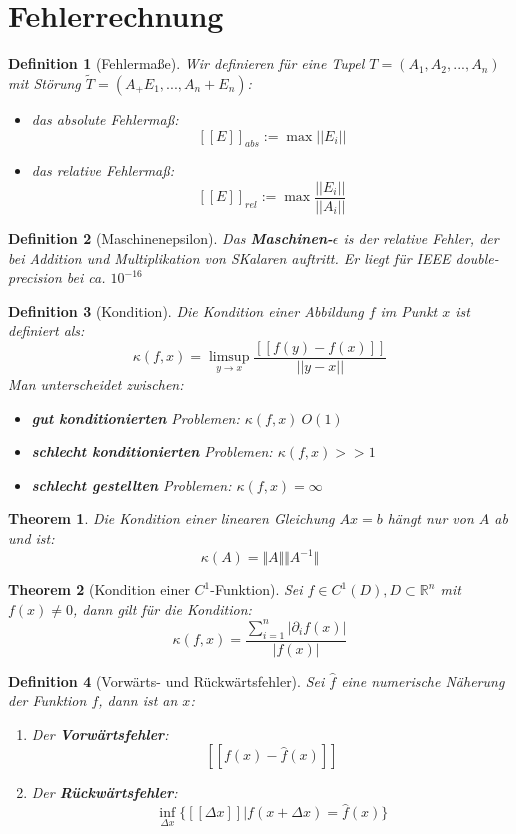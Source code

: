 \documentclass[10pt,a4paper]{article}
\newtheorem{theorem}{Theorem}
\newtheorem{definition}{Definition}
\begin{document}
	\section{Fehlerrechnung}
	\begin{definition}[Fehlermaße]
		Wir definieren für eine Tupel $T= (A_1, A_2, ..., A_n)$ mit Störung $\tilde{T}=(A_+E_1, ..., A_n+E_n)$:
		\begin{itemize}
			\item das absolute Fehlermaß:
			$$[[E]]_{abs} := \max||E_i||$$
			\item das relative Fehlermaß:
			$$[[E]]_{rel}:= \max\frac{||E_i||}{||A_i||}$$
		\end{itemize}
	\end{definition}
	\begin{definition}[Maschinenepsilon]
		Das \textbf{Maschinen-$\epsilon$} is der relative Fehler, der bei Addition und Multiplikation von SKalaren auftritt. Er liegt für IEEE double-precision bei ca. $10^{-16}$
	\end{definition}
	\begin{definition}[Kondition]
		Die Kondition einer Abbildung $f$ im Punkt $x$ ist definiert als:
		$$\kappa(f, x) = \limsup_{y\to x}\frac{[[f(y)-f(x)]]}{||y-x||}$$
		Man unterscheidet zwischen:
		\begin{itemize}
			\item \textbf{gut konditionierten} Problemen: $\kappa(f,x) ~ O(1)$
			\item \textbf{schlecht konditionierten} Problemen: $\kappa(f, x) >> 1$
			\item \textbf{schlecht gestellten} Problemen: $\kappa(f, x) = \infty$
		\end{itemize}
	\end{definition}
	\begin{theorem}
		Die Kondition einer linearen Gleichung $Ax= b$ hängt nur von $A$ ab und ist:
		$$\kappa(A) = \Vert A\Vert\Vert A^{-1}\Vert$$
	\end{theorem}
	\begin{theorem}[Kondition einer $C^1$-Funktion]
		Sei $f\in C^1(D), D\subset \mathbb{R}^n$ mit $f(x)\neq 0$, dann gilt für die Kondition:
		$$\kappa(f,x) = \frac{\sum_{i=1}^n|\partial_if(x)|}{|f(x)|}$$
	\end{theorem}
	\begin{definition}[Vorwärts- und Rückwärtsfehler]
		Sei $\hat{f}$ eine numerische Näherung der Funktion $f$, dann ist an $x$:
		\begin{enumerate}
			\item Der \textbf{Vorwärtsfehler}:
			$$[[f(x)-\hat{f}(x)]]$$
			\item Der \textbf{Rückwärtsfehler}: 
			$$\inf_{\Delta x} \{[[\Delta x]] | f(x+\Delta x) = \hat{f}(x)\}$$
		\end{enumerate}
	\end{definition}
\end{document}
